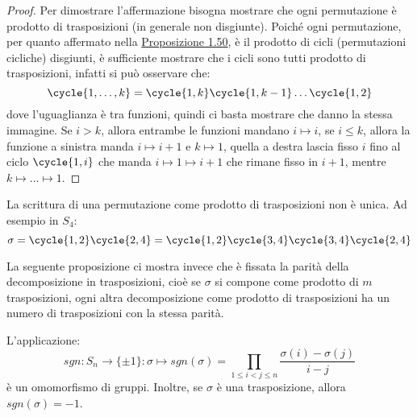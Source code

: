 \documentclass[11pt]{scrartcl}
\begin{document}
\begin{proof}
    Per dimostrare l'affermazione bisogna mostrare che ogni permutazione è prodotto di trasposizioni (in generale non disgiunte).
    Poiché ogni permutazione, per quanto affermato nella \hyperref[perm]{Proposizione 1.50}, è il prodotto di cicli (permutazioni cicliche) disgiunti,
    è sufficiente mostrare che i cicli sono tutti prodotto di trasposizioni, infatti si può osservare che:
        \[ \cycle{1,\ldots,k} = \cycle{1,k}\cycle{1,k-1}\ldots\cycle{1,2}
            \]
    dove l'uguaglianza è tra funzioni, quindi ci basta mostrare che danno la stessa immagine. Se $i>k$, allora entrambe le funzioni mandano $i \longmapsto i$, se 
    $i \leq k$, allora la funzione a sinistra manda $i \longmapsto i+1$ e $k \longmapsto 1$, quella a destra lascia fisso $i$ fino al ciclo $\cycle{1,i}$ che manda $i \longmapsto 1 \longmapsto i+1$
    che rimane fisso in $i+1$, mentre $k \longmapsto \ldots \longmapsto 1$.
\end{proof}

\begin{remark}
    La scrittura di una permutazione come prodotto di trasposizioni non è unica. Ad esempio in $S_4$:
        \[ \sigma = \cycle{1,2}\cycle{2,4} = \cycle{1,2}\cycle{3,4}\cycle{3,4}\cycle{2,4}
            \]
\end{remark}

La seguente proposizione ci mostra invece che è fissata la parità della decomposizione in trasposizioni, cioè se $\sigma$ si compone come prodotto di $m$ trasposizioni,
ogni altra decomposizione come prodotto di trasposizioni ha un numero di trasposizioni con la stessa parità.

\begin{proposition}
    L'applicazione:
        \[ sgn : S_n \longrightarrow \{\pm1\} : \sigma \longmapsto sgn(\sigma) = \prod_{1 \leq i < j \leq n} \frac{\sigma(i) - \sigma(j)}{i - j}
            \]
    è un omomorfismo di gruppi. Inoltre, se $\sigma$ è una trasposizione, allora $sgn(\sigma) = -1$.
\end{proposition}
\end{document}
